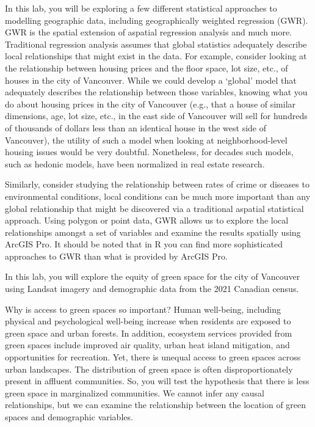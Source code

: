 \documentclass[
]{book}
\begin{document}
In this lab, you will be exploring a few different statistical approaches to modelling geographic data, including geographically weighted regression (GWR). GWR is the spatial extension of aspatial regression analysis and much more. Traditional regression analysis assumes that global statistics adequately describe local relationships that might exist in the data. For example, consider looking at the relationship between housing prices and the floor space, lot size, etc., of houses in the city of Vancouver. While we could develop a `global' model that adequately describes the relationship between those variables, knowing what you do about housing prices in the city of Vancouver (e.g., that a house of similar dimensions, age, lot size, etc., in the east side of Vancouver will sell for hundreds of thousands of dollars less than an identical house in the west side of Vancouver), the utility of such a model when looking at neighborhood-level housing issues would be very doubtful. Nonetheless, for decades such models, such as hedonic models, have been normalized in real estate research.

Similarly, consider studying the relationship between rates of crime or diseases to environmental conditions, local conditions can be much more important than any global relationship that might be discovered via a traditional aspatial statistical approach. Using polygon or point data, GWR allows us to explore the local relationships amongst a set of variables and examine the results spatially using ArcGIS Pro. It should be noted that in R you can find more sophisticated approaches to GWR than what is provided by ArcGIS Pro.

In this lab, you will explore the equity of green space for the city of Vancouver using Landsat imagery and demographic data from the 2021 Canadian census.

Why is access to green spaces so important? Human well-being, including physical and psychological well-being increase when residents are exposed to green space and urban forests. In addition, ecosystem services provided from green spaces include improved air quality, urban heat island mitigation, and opportunities for recreation. Yet, there is unequal access to green spaces across urban landscapes. The distribution of green space is often disproportionately present in affluent communities. So, you will test the hypothesis that there is less green space in marginalized communities. We cannot infer any causal relationships, but we can examine the relationship between the location of green spaces and demographic variables.
\end{document}
